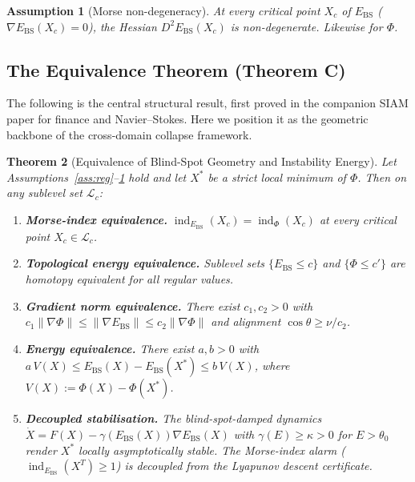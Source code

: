\documentclass[11pt,a4paper]{article}
\newcommand{\Ebs}{E_{\mathrm{BS}}}
\newcommand{\Xst}{X^*}
\newcommand{\costheta}{\cos\theta}
\newcommand{\grad}{\nabla}
\newcommand{\norm}[1]{\|#1\|}
\DeclareMathOperator{\ind}{ind}
\newtheorem{theorem}{Theorem}
\newtheorem{assumption}[theorem]{Assumption}
\begin{document}
\begin{assumption}[Morse non-degeneracy]\label{ass:morse}
At every critical point $X_c$ of $\Ebs$
($\grad\Ebs(X_c)=0$), the Hessian $D^2\Ebs(X_c)$ is
non-degenerate.  Likewise for $\Phi$.
\end{assumption}

\subsection{The Equivalence Theorem (Theorem C)}

The following is the central structural result, first proved in
the companion SIAM paper \cite{odeyemi2026siam} for finance and
Navier--Stokes.  Here we position it as the geometric backbone
of the cross-domain collapse framework.

\begin{theorem}[Equivalence of Blind-Spot Geometry and Instability
Energy]\label{thm:equiv}
Let Assumptions~\ref{ass:reg}--\ref{ass:morse} hold and let
$\Xst$ be a strict local minimum of $\Phi$.  Then on any sublevel
set $\mathcal{L}_c$:
\begin{enumerate}[nosep]
  \item[\textup{(C1)}] \textbf{Morse-index equivalence.}
    $\ind_{\Ebs}(X_c) = \ind_\Phi(X_c)$ at every critical point
    $X_c\in\mathcal{L}_c$.
  \item[\textup{(C2)}] \textbf{Topological energy equivalence.}
    Sublevel sets $\{\Ebs\le c\}$ and $\{\Phi\le c'\}$ are
    homotopy equivalent for all regular values.
  \item[\textup{(C3)}] \textbf{Gradient norm equivalence.}
    There exist $c_1,c_2>0$ with
    $c_1\norm{\grad\Phi}\le\norm{\grad\Ebs}\le c_2\norm{\grad\Phi}$
    and alignment $\costheta\ge\nu/c_2$.
  \item[\textup{(C4)}] \textbf{Energy equivalence.}
    There exist $a,b>0$ with
    $a\,V(X)\le\Ebs(X)-\Ebs(\Xst)\le b\,V(X)$, where
    $V(X):=\Phi(X)-\Phi(\Xst)$.
  \item[\textup{(C5)}] \textbf{Decoupled stabilisation.}
    The blind-spot-damped dynamics
    $\dot{X}=F(X)-\gamma(\Ebs(X))\grad\Ebs(X)$ with
    $\gamma(E)\ge\kappa>0$ for $E>\theta_0$ render $\Xst$
    locally asymptotically stable.  The Morse-index alarm
    ($\ind_{\Ebs}(X^T)\ge 1$) is decoupled from the
    Lyapunov descent certificate.
\end{enumerate}
\end{theorem}
\end{document}
